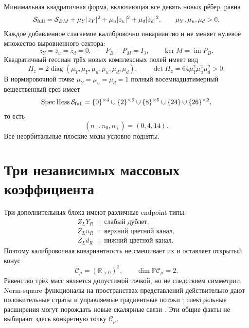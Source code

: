Минимальная квадратичная форма, включающая все девять новых рёбер, равна
\begin{equation}
 \mathcal S_{\rm full}
 =\mathcal S_{BM}
 +\mu_Y|z_Y|^2+\mu_u|z_u|^2+\mu_d|z_d|^2,
 \qquad
 \mu_Y,\mu_u,\mu_d>0.
 \label{eq:v8-full-graph-aligned-action}
\end{equation}
Каждое добавленное слагаемое калибровочно инвариантно и не меняет нулевое
множество выровненного сектора:
\begin{equation}
 z_Y=z_u=z_d=0,
 \qquad
 P_B+P_M=I_3,
 \qquad
 \ker M=\operatorname{im}P_B.
 \label{eq:v8-full-graph-aligned-zero-set}
\end{equation}
Квадратичный гессиан трёх новых комплексных полей имеет вид
\begin{equation}
 H_z=2\operatorname{diag}
 (\mu_Y,\mu_Y,\mu_u,\mu_u,\mu_d,\mu_d),
 \qquad
 \det H_z=64\mu_Y^2\mu_u^2\mu_d^2>0.
 \label{eq:v8-full-graph-aligned-extra-hessian}
\end{equation}
В нормировочной точке $\mu_Y=\mu_u=\mu_d=1$ полный восемнадцатимерный
вещественный срез имеет
\begin{equation}
 \operatorname{Spec}\operatorname{Hess}\mathcal S_{\rm full}
 =\{0\}^{\times4}\cup\{2\}^{\times6}
 \cup\{8\}^{\times5}\cup\{24\}\cup\{26\}^{\times2},
 \label{eq:v8-full-graph-aligned-spectrum}
\end{equation}
то есть
\begin{equation}
 (n_-,n_0,n_+)=(0,4,14).
 \label{eq:v8-full-graph-aligned-signature}
\end{equation}
Все неорбитальные плоские моды условно подняты.

\section{Три независимых массовых коэффициента}

Три дополнительных блока имеют различные endpoint-типы:
\begin{equation}
 \begin{aligned}
 Z_LY_R&:\text{ слабый дублет},\\
 Z_Lu_R&:\text{ верхний цветной канал},\\
 Z_Ld_R&:\text{ нижний цветной канал}.
 \end{aligned}
 \label{eq:v8-full-graph-aligned-extra-types}
\end{equation}
Поэтому калибровочная ковариантность не смешивает их и оставляет открытый
конус
\begin{equation}
 \mathcal C_\mu=(\mathbb R_{>0})^3,
 \qquad
 \dim\mathbb P\mathcal C_\mu=2.
 \label{eq:v8-full-graph-aligned-mass-cone}
\end{equation}
Равенство трёх масс является допустимой точкой, но не следствием симметрии.
Norm-square функционалы на пространствах представлений действительно дают
положительные страты и управляемые градиентные потоки
\cite{v8-full-graph-aligned-quiver}; спектральные расширения могут порождать
новые скалярные связи \cite{v8-full-graph-aligned-scalar}. Эти общие факты
не выбирают здесь конкретную точку $\mathcal C_\mu$.

